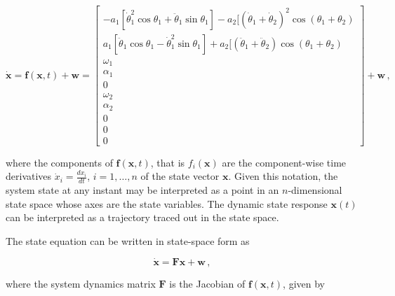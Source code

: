 \begin{equation} \label{eq:state_vector_derivative}
  \dot{\mathbf{x}} = \mathbf{f}(\mathbf{x}, t) + \mathbf{w} = \left[\begin{smallmatrix}
  -a_1 [\dot{\theta}^2_1 \cos \theta_1 + \ddot{\theta}_1 \sin \theta_1] - a_2 [(\dot{\theta}_1 + \dot{\theta}_2)^2 \cos(\theta_1 + \theta_2) \\
  a_1 [\ddot{\theta}_1 \cos \theta_1 - \dot{\theta}^2_1 \sin \theta_1] + a_2 [(\ddot{\theta}_1 + \ddot{\theta}_2) \cos(\theta_1 + \theta_2) \\ \omega_1 \\ \alpha_1 \\ 0 \\ \omega_2 \\ \alpha_2 \\ 0 \\ 0 \\ 0
  \end{smallmatrix}\right] + \mathbf{w}\,,
\end{equation}

\noindent
where the components of $\mathbf{f}(\mathbf{x},t)$, that is $f_i(\mathbf{x})$ are the component-wise time derivatives $\dot{x}_i = \frac{dx_i}{dt}$, $i = 1, \dots, n$ of the state vector $\mathbf{x}$. Given this notation, the system state at any instant may be interpreted as a point in an $n$-dimensional state space whose axes are the state variables. The dynamic state response $\mathbf{x}(t)$ can be interpreted as a trajectory traced out in the state space.

The state equation can be written in state-space form as 

\begin{equation}
  \dot{\mathbf{x}} = \mathbf{F} \mathbf{x} + \mathbf{w}\,,
\end{equation}

\noindent
where the system dynamics matrix $\mathbf{F}$ is the Jacobian of $\mathbf{f}(\mathbf{x},t)$, given by

